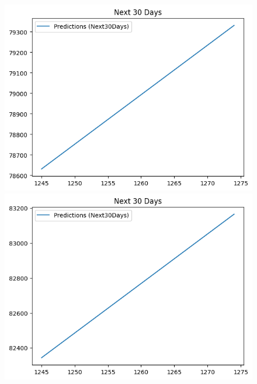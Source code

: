 \begin{figure}[H]
\begin{minipage}{0.15\textwidth}
    \includegraphics[width=1\textwidth]{resources/chapter-5/predicted/VCB_LinearRegression_8-2 30 DAYS.png}
    \end{minipage}
    \hfill
        \begin{minipage}{0.15\textwidth}
    \centering
    \includegraphics[width=1\textwidth]{resources/chapter-5/predicted/VCB_LinearRegression_9-1 30 DAYS.png}
    \end{minipage}
    \hfill
    \begin{minipage}{0.15\textwidth}
    \centering

\end{minipage}
\end{figure}
